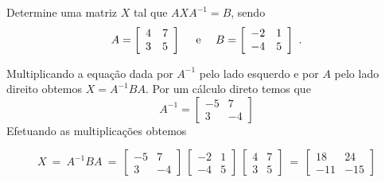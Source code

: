 \begin{problem}
Determine uma matriz $X$ tal que $A X A^{-1} = B$, sendo
$$A = \left[\begin{array}{rr}
	4 &  7  \\
	3 &  5  \end{array}\right] \ \ \ \ {\rm e} \ \ \ \
B = \left[\begin{array}{rr}
 -2 &  1  \\
 -4 &  5  \end{array}\right] \ . $$
\end{problem}
\begin{solution}
Multiplicando a equação dada por $A^{-1}$ pelo lado esquerdo e por $A$ pelo lado direito obtemos 
$X = A^{-1} B A$. Por um cálculo direto temos que
$$A^{-1} = \left[\begin{array}{rr}
 -5 &  7  \\
	3 & -4  \end{array}\right]$$
Efetuando as multiplicações obtemos

$$X\ =\ A^{-1} B A\ =\ 
\left[\begin{array}{rr}
 -5 &  7  \\
	3 & -4  \end{array}\right]\ 
\left[\begin{array}{rr}
 -2 &  1  \\
 -4 &  5  \end{array}\right]\ 
\left[\begin{array}{rr}
	4 &  7  \\
	3 &  5  \end{array}\right]\ =\ 
\left[\begin{array}{rr}
 18 &  24  \\
-11 & -15  \end{array}\right]$$
\end{solution}

